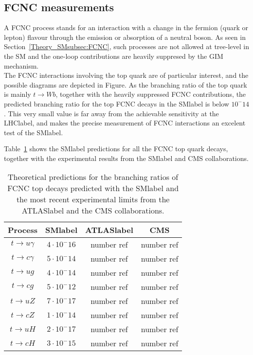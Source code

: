 \clearpage
\subsection{FCNC measurements}

A FCNC process stands for an interaction with a change in the fermion (quark or lepton) flavour through
the emission or absorption of a neutral boson. As seen in Section~\ref{Theory_SMsubsec:FCNC}, such processes are not allowed at tree-level in the SM and the one-loop contributions are heavily suppresed by the GIM mechanism.\\

The FCNC interactions involving the top quark are of particular interest, and the possible diagrams are depicted in Figure. As the branching ratio of the top quark is mainly $t\to Wb$, together with the heavily suppressed FCNC contributions, the predicted branching ratio for the top FCNC decays in the \acrshort{SMlabel} is below $10^-14$. This very small value is far away from the achievable sensitivity at the \acrshort{LHClabel}, and makes the precise measurement of FCNC interactions an excelent test of the \acrshort{SMlabel}.

Table~\ref{tabSM:FCNCmeasurements} shows the \acrshort{SMlabel} predictions for all the FCNC top quark decays, together with the experimental results from the \acrshort{SMlabel} and CMS collaborations.

\begin{table}[htbp]
    \begin{tabular}{c|c|cc}
    \toprule\toprule
    Process & \acrshort{SMlabel} & \acrshort{ATLASlabel} & CMS \\ \midrule
    $t\to u\gamma$  & $4\cdot 10^-16$ &  number ref  & number ref \\ 
    $t\to c\gamma$  & $5\cdot 10^-14$ &  number ref  & number ref \\ \midrule
    $t\to ug$  & $4\cdot 10^-14$ &  number ref  & number ref \\ 
    $t\to cg$  & $5\cdot 10^-12$ &  number ref  & number ref \\ \midrule
    $t\to uZ$  & $7\cdot 10^-17$ &  number ref  & number ref \\ 
    $t\to cZ$  & $1\cdot 10^-14$ &  number ref  & number ref \\ \midrule
    $t\to uH$  & $2\cdot 10^-17$ &  number ref  & number ref \\ 
    $t\to cH$  & $3\cdot 10^-15$ &  number ref  & number ref \\ \midrule
    \bottomrule\bottomrule
    \end{tabular}
    \caption{Theoretical predictions for the branching ratios of FCNC top decays predicted with the \acrshort{SMlabel} and the most recent experimental limits from the \acrshort{ATLASlabel} and the CMS collaborations.}
    \label{tabSM:FCNCmeasurements}
    \end{table}

